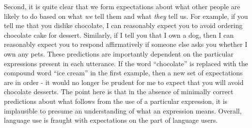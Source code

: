 Second, it is quite clear that we form expectations about what other people are likely to do based on what \textit{we} tell them and what \textit{they} tell us. For example, if you tell me that you dislike chocolate, I can reasonably expect you to avoid ordering chocolate cake for dessert. Similarly, if I tell you that I own a dog, then I can reasonably expect you to respond affirmatively if someone else asks you whether I own any pets. These predictions are importantly dependent on the particular expressions present in each utterance. If the word ``chocolate'' is replaced with the compound word ``ice cream'' in the first example, then a new set of expectations are in order - it would no longer be prudent for me to expect that you will avoid chocolate desserts. The point here is that in the absence of minimally correct predictions about what follows from the use of a particular expression, it is implausible to presume an understanding of what an expression means. Overall, language use is fraught with expectations on the part of language users.
 
